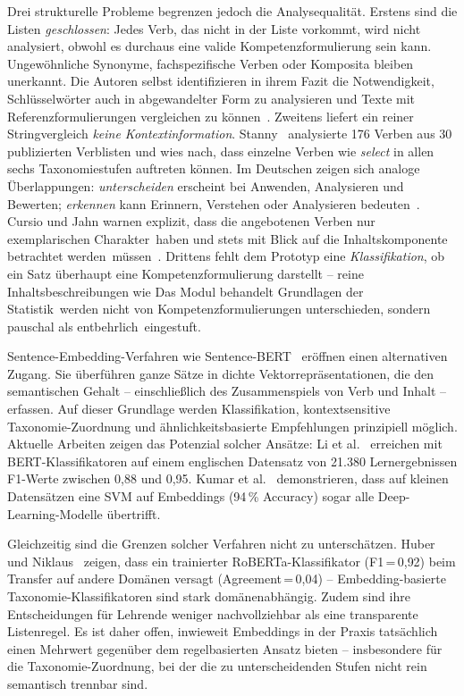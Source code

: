 Drei strukturelle Probleme begrenzen jedoch die Analysequalität.
Erstens sind die Listen \emph{geschlossen}: Jedes Verb, das nicht in der Liste vorkommt, wird nicht analysiert, obwohl es durchaus eine valide Kompetenzformulierung sein kann.
Ungewöhnliche Synonyme, fachspezifische Verben oder Komposita bleiben unerkannt.
Die Autoren selbst identifizieren in ihrem Fazit die Notwendigkeit, Schlüsselwörter auch in abgewandelter Form zu analysieren und Texte mit Referenzformulierungen vergleichen zu können~\cite{loth2022kompetenzeditor}.
Zweitens liefert ein reiner Stringvergleich \emph{keine Kontextinformation}.
Stanny~\cite{stanny2016reevaluating} analysierte 176 Verben aus 30 publizierten Verblisten und wies nach, dass einzelne Verben wie \emph{select} in allen sechs Taxonomiestufen auftreten können.
Im Deutschen zeigen sich analoge Überlappungen: \emph{unterscheiden} erscheint bei Anwenden, Analysieren und Bewerten; \emph{erkennen} kann Erinnern, Verstehen oder Analysieren bedeuten~\cite{cursio2013leitfaden}.
Cursio und Jahn warnen explizit, dass die angebotenen Verben \glqq nur exemplarischen Charakter\grqq\ haben und \glqq stets mit Blick auf die Inhaltskomponente betrachtet werden\grqq\ müssen~\cite{cursio2013leitfaden}.
Drittens fehlt dem Prototyp eine \emph{Klassifikation}, ob ein Satz überhaupt eine Kompetenzformulierung darstellt -- reine Inhaltsbeschreibungen wie \glqq Das Modul behandelt Grundlagen der Statistik\grqq\ werden nicht von Kompetenzformulierungen unterschieden, sondern pauschal als \glqq entbehrlich\grqq\ eingestuft.

Sentence-Embedding-Verfahren wie Sentence-BERT~\cite{reimers2019sentencebert} eröffnen einen alternativen Zugang.
Sie überführen ganze Sätze in dichte Vektorrepräsentationen, die den semantischen Gehalt -- einschließlich des Zusammenspiels von Verb und Inhalt -- erfassen.
Auf dieser Grundlage werden Klassifikation, kontextsensitive Taxonomie-Zuordnung und ähnlichkeitsbasierte Empfehlungen prinzipiell möglich.
Aktuelle Arbeiten zeigen das Potenzial solcher Ansätze: Li et al.~\cite{li2022bloomclassification} erreichen mit BERT-Klassifikatoren auf einem englischen Datensatz von 21.380 Lernergebnissen F1-Werte zwischen 0{,}88 und 0{,}95.
Kumar et al.~\cite{kumar2025automated} demonstrieren, dass auf kleinen Datensätzen eine SVM auf Embeddings (94\,\% Accuracy) sogar alle Deep-Learning-Modelle übertrifft.

Gleichzeitig sind die Grenzen solcher Verfahren nicht zu unterschätzen.
Huber und Niklaus~\cite{huber2025llmsblooms} zeigen, dass ein trainierter RoBERTa-Klassifikator (F1\,=\,0{,}92) beim Transfer auf andere Domänen versagt (Agreement\,=\,0{,}04) -- Embedding-basierte Taxonomie-Klassifikatoren sind stark domänenabhängig.
Zudem sind ihre Entscheidungen für Lehrende weniger nachvollziehbar als eine transparente Listenregel.
Es ist daher offen, inwieweit Embeddings in der Praxis tatsächlich einen Mehrwert gegenüber dem regelbasierten Ansatz bieten -- insbesondere für die Taxonomie-Zuordnung, bei der die zu unterscheidenden Stufen nicht rein semantisch trennbar sind.

